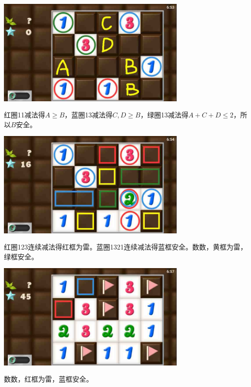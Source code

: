 \subsection{} %
\begin{center}
    \includegraphics[width=0.7\textwidth]{puzzlelow/196-1.jpg}
\end{center}
红圈11减法得$A\ge B$，蓝圈13减法得$C,D\ge B$，绿圈13减法得$A+C+D\le 2$，所以$B$安全。
\begin{center}
    \includegraphics[width=0.7\textwidth]{puzzlelow/196-2.jpg}
\end{center}
红圈123连续减法得红框为雷。蓝圈1321连续减法得蓝框安全。数数，黄框为雷，绿框安全。
\begin{center}
    \includegraphics[width=0.7\textwidth]{puzzlelow/196-3.jpg}
\end{center}
数数，红框为雷，蓝框安全。


